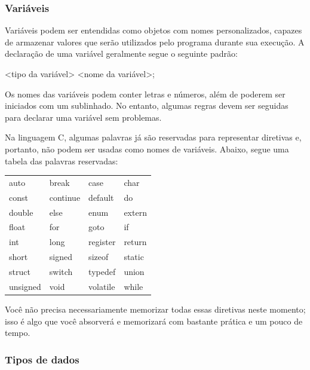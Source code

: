 \subsubsection{Variáveis}

Variáveis podem ser entendidas como objetos com nomes personalizados, 
capazes de armazenar valores que serão utilizados pelo programa durante 
sua execução. A declaração de uma variável geralmente segue o seguinte padrão:

\begin{textbox}
    <tipo da variável> <nome da variável>;
\end{textbox}

Os nomes das variáveis podem conter letras e números, além de poderem 
ser iniciados com um sublinhado. No entanto, algumas regras devem ser 
seguidas para declarar uma variável sem problemas.

Na linguagem C, algumas palavras já são reservadas para representar 
diretivas e, portanto, não podem ser usadas como nomes de variáveis. 
Abaixo, segue uma tabela das palavras reservadas:

\begin{table}[h]
  \centering
  \begin{tabular}{llll}
    auto      & break     & case      & char      \\
    const     & continue  & default   & do        \\
    double    & else      & enum      & extern    \\
    float     & for       & goto      & if        \\
    int       & long      & register  & return    \\
    short     & signed    & sizeof    & static    \\
    struct    & switch    & typedef   & union     \\
    unsigned  & void      & volatile  & while     \\
  \end{tabular}
\end{table}

Você não precisa necessariamente memorizar todas essas diretivas neste 
momento; isso é algo que você absorverá e memorizará com bastante prática e 
um pouco de tempo.

\subsubsection{Tipos de dados} \label{tipos-de-dados}

